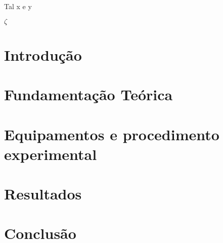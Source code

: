 \documentclass[12pt,openright,twoside,a4paper]{abntex2}
\begin{document}
\imprimircapa

\imprimirfolhaderosto*

\begin{resumo}
Tal x e y
\end{resumo}

\begin{simbolos}

\item $\zeta$




\end{simbolos}



\tableofcontents


\textual



\chapter{Introdução}\label{ch: Introdução}



\chapter{Fundamentação Teórica}\label{ch: Fundamentação Teorica}



\chapter{Equipamentos e procedimento experimental}\label{ch: Equipamentos e procedimento experimental}



\chapter{Resultados}\label{ch: Resultados}



\chapter{Conclusão}\label{ch: conclusões}
\end{document}
